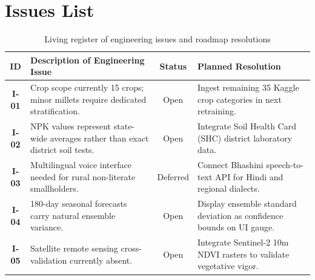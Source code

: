 \documentclass[11pt,a4paper]{report}
\begin{document}
\chapter{Issues List}
\begin{table}[htbp]
\centering
\small
\caption{Living register of engineering issues and roadmap resolutions}
\begin{tabularx}{\textwidth}{cXcX}
\toprule
\textbf{ID} & \textbf{Description of Engineering Issue} & \textbf{Status} & \textbf{Planned Resolution} \\
\midrule
\textbf{I-01} & Crop scope currently 15 crops; minor millets require dedicated stratification. & Open & Ingest remaining 35 Kaggle crop categories in next retraining. \\
\addlinespace
\textbf{I-02} & NPK values represent state-wide averages rather than exact district soil tests. & Open & Integrate Soil Health Card (SHC) district laboratory data. \\
\addlinespace
\textbf{I-03} & Multilingual voice interface needed for rural non-literate smallholders. & Deferred & Connect Bhashini speech-to-text API for Hindi and regional dialects. \\
\addlinespace
\textbf{I-04} & 180-day seasonal forecasts carry natural ensemble variance. & Open & Display ensemble standard deviation as confidence bounds on UI gauge. \\
\addlinespace
\textbf{I-05} & Satellite remote sensing cross-validation currently absent. & Open & Integrate Sentinel-2 10m NDVI rasters to validate vegetative vigor. \\
\bottomrule
\end{tabularx}
\end{table}
\end{document}
